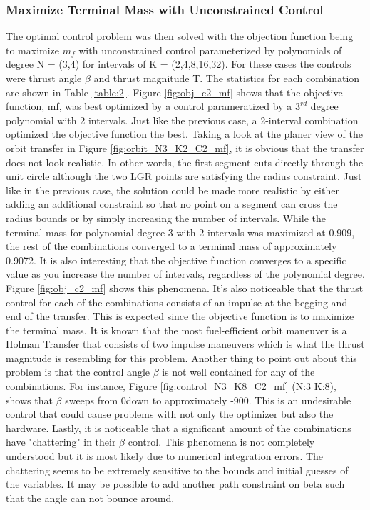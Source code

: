 \documentclass[]{article}
\begin{document}
	\subsubsection{Maximize Terminal Mass with Unconstrained Control}
	 The optimal control problem was then solved with the objection function being to maximize \(m_f\) with unconstrained control parameterized by polynomials of degree N = (3,4) for intervals of K = (2,4,8,16,32). For these cases the controls were thrust angle \(\beta\) and thrust magnitude T. The statistics for each combination are shown in Table \ref{table:2}. Figure \ref{fig:obj_c2_mf} shows that the objective function, mf, was best optimized by a control parameratized by a \(3^{rd}\) degree polynomial with 2 intervals. Just like the previous case, a 2-interval combination optimized the objective function the best. Taking a look at the planer view of the orbit transfer in Figure \ref{fig:orbit_N3_K2_C2_mf}, it is obvious that the transfer does not look realistic. In other words, the first segment cuts directly through the unit circle although the two LGR points are satisfying the radius constraint. Just like in the previous case, the solution could be made more realistic by either adding an additional constraint so that no point on a segment can cross the radius bounds or by simply increasing the number of intervals. While the terminal mass for polynomial degree 3 with 2 intervals was maximized at 0.909, the rest of the combinations converged to a terminal mass of approximately 0.9072. It is also interesting that the objective function converges to a specific value as you increase the number of intervals, regardless of the polynomial degree. Figure \ref{fig:obj_c2_mf} shows this phenomena. It's also noticeable that the thrust control for each of the combinations consists of an impulse at the begging and end of the transfer. This is expected since the objective function is to maximize the terminal mass. It is known that the most fuel-efficient orbit maneuver is a Holman Transfer that consists of two impulse maneuvers which is what the thrust magnitude is resembling for this problem. Another thing to point out about this problem is that the control angle \(\beta\) is not well contained for any of the combinations. For instance, Figure \ref{fig:control_N3_K8_C2_mf} (N:3 K:8), shows that \(\beta\) sweeps from 0\degree down to approximately -900\degree. This is an undesirable control that could cause problems with not only the optimizer but also the hardware. Lastly, it is noticeable that a significant amount of the combinations have "chattering" in their \(\beta\) control. This phenomena is not completely understood but it is most likely due to numerical integration errors. The chattering seems to be extremely sensitive to the bounds and initial guesses of the variables. It may be possible to add another path constraint on beta such that the angle can not bounce around.
\end{document}
